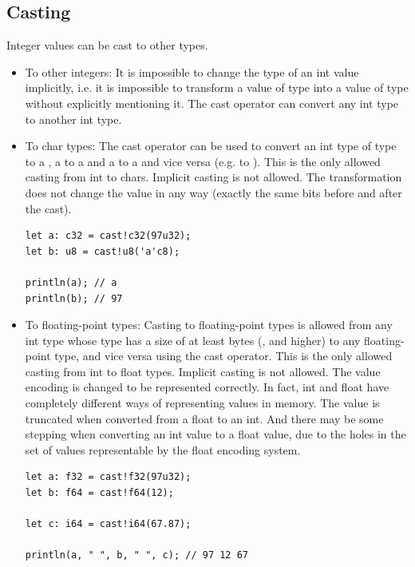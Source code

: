 \subsection{Casting}
\label{sec:orgfdc3d25}

Integer values can be cast to other types.

\begin{itemize}
  \setlength\itemsep{-4pt}
\item To other integers: It is impossible to change the type of an int value
implicitly, i.e. it is impossible to transform a value of type  into
a value of type  without explicitly mentioning it. The cast operator
 can convert any int type to another int type.


\item To char types: The cast operator can be used to convert an int type of
  type  to a , a  to a  and a
   to a  and vice versa (e.g.  to
  ). This is the only allowed casting from int to chars. Implicit
  casting is not allowed. The transformation does not change the value in any
  way (exactly the same bits before and after the cast).

  \begin{lstlisting}[style=coloredverbatim]
let a: c32 = cast!c32(97u32);
let b: u8 = cast!u8('a'c8);

println(a); // a
println(b); // 97
  \end{lstlisting}

\item To floating-point types: Casting to floating-point types is allowed from
  any int type whose type has a size of at least  bytes (,
   and higher) to any floating-point type, and vice versa using the
  cast operator. This is the only allowed casting from int to float types.
  Implicit casting is not allowed. The value encoding is changed to be
  represented correctly. In fact, int and float have completely different ways
  of representing values in memory. The value is truncated when converted from a
  float to an int. And there may be some stepping when converting an int value
  to a float value, due to the holes in the set of values representable by the
  float encoding system.

  \begin{lstlisting}[style=coloredverbatim]
let a: f32 = cast!f32(97u32);
let b: f64 = cast!f64(12);

let c: i64 = cast!i64(67.87);

println(a, " ", b, " ", c); // 97 12 67
  \end{lstlisting}

\end{itemize}

